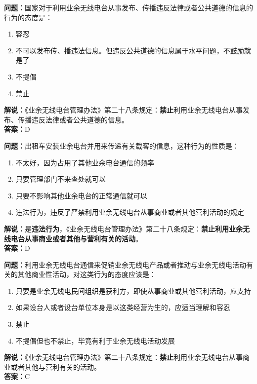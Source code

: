 \bigskip


\noindent\textbf{问题：}国家对于利用业余无线电台从事发布、传播违反法律或者公共道德的信息的行为的态度是：
\begin{enumerate}[label=\Alph*), leftmargin=3em]
	\item 容忍
	\item 不可以发布传、播违法信息。但违反公共道德的信息属于水平问题，不鼓励就是了
	\item 不提倡
	\item 禁止
\end{enumerate}
\noindent\textbf{解说：}《业余无线电台管理办法》第二十八条规定：\textbf{禁止}利用业余无线电台从事发布、传播违反法律或者公共道德的信息。\\\noindent\textbf{答案：}D



\bigskip


\noindent\textbf{问题：}出租车安装业余电台并用来传递有关载客的信息，这种行为的性质是：
\begin{enumerate}[label=\Alph*), leftmargin=3em]
	\item 不太好，因为占用了其他业余电台通信的频率
	\item 只要管理部门不来查处就可以
	\item 只要不影响其他业余电台的正常通信就可以
	\item 违法行为，违反了严禁利用业余无线电台从事商业或者其他营利活动的规定%
\end{enumerate}
\noindent\textbf{解说：}是\textbf{违法行为}，《业余无线电台管理办法》第二十八条规定：\textbf{禁止利用业余无线电台从事商业或者其他与营利有关的活动}。\\\noindent\textbf{答案：}D



\bigskip


\noindent\textbf{问题：}利用业余无线电台通信来促销业余无线电产品或者推动与业余无线电活动有关的其他商业性活动，对这类行为的态度应该是：
\begin{enumerate}[label=\Alph*), leftmargin=3em]
	\item 只要是业余无线电民间组织是获利方，即使从事商业或其他营利活动，应支持
	\item 如果设台人或者设台单位本身是以这类经营为生的，应适当理解和容忍
	\item 禁止
	\item 不提倡但也不禁止，毕竟有利于业余无线电活动发展
\end{enumerate}
\noindent\textbf{解说：}《业余无线电台管理办法》第二十八条规定：\textbf{禁止}利用业余无线电台从事商业或者其他与营利有关的活动。\\\noindent\textbf{答案：}C




